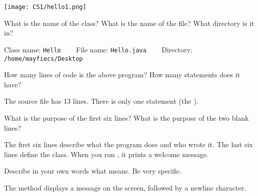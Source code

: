 
\begin{center}
\texttt{[image: CS1/hello1.png]}
\end{center}




\Q What is the name of the class?
What is the name of the file?
What directory is it in?

\begin{answer}
Class name: \texttt{Hello} ~~~
File name: \texttt{Hello.java} ~~~
Directory: \texttt{/home/mayfiecs/Desktop}
\end{answer}


\Q How many lines of code is the above program?
How many statements does it have?

\begin{answer}
The source file has 13 lines.
There is only one statement (the ).
\end{answer}


\Q What is the purpose of the first six lines?
What is the purpose of the two blank lines?

\begin{answer}
The first six lines describe what the program does and who wrote it.
The last six lines define the  class.
When you run , it prints a welcome message.
\end{answer}


\Q Describe in your own words what  means.
Be very specific.

\begin{answer}
The  method displays a message on the screen, followed by a newline character.
\end{answer}
